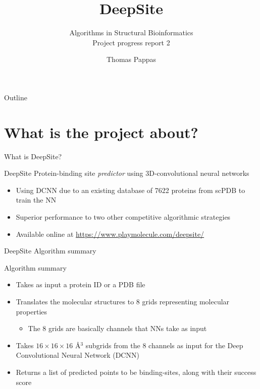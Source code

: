 \documentclass{beamer}
\begin{document}
\title{DeepSite}
\subtitle{Algorithms in Structural Bioinformatics \\ Project progress report 2}
\author{Thomas Pappas}
\maketitle

\begin{frame}{Outline}
  \tableofcontents
\end{frame}

\section{What is the project about?}

\begin{frame}{What is DeepSite?}
  \begin{block}{DeepSite}
    Protein-binding site \emph{predictor} using 3D-convolutional neural networks
    \begin{itemize}
      \item Using DCNN due to an existing database of 7622 proteins from scPDB to train the NN
      \item Superior performance to two other competitive algorithmic strategies
      \item Available online at \url{https://www.playmolecule.com/deepsite/}
    \end{itemize}
  \end{block}
\end{frame}

\begin{frame}{DeepSite Algorithm summary}
  \begin{block}{Algorithm summary}
    \begin{itemize}
      \item Takes as input a protein ID or a PDB file
      \item Translates the molecular structures to 8 grids representing molecular properties
      \begin{itemize}
        \item The 8 grids are basically channels that NNs take as input
      \end{itemize}
      \item Takes $16 \times 16 \times 16$ \AA$^3$ subgrids from the 8 channels as input for the Deep Convolutional Neural Network (DCNN)
      \item Returns a list of predicted points to be binding-sites, along with their success score
    \end{itemize}
  \end{block}
\end{frame}
\end{document}
